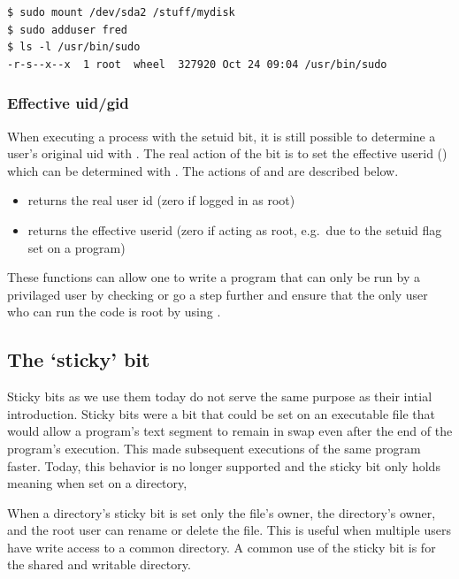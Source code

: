 \begin{lstlisting}
$ sudo mount /dev/sda2 /stuff/mydisk
$ sudo adduser fred
$ ls -l /usr/bin/sudo
-r-s--x--x  1 root  wheel  327920 Oct 24 09:04 /usr/bin/sudo
\end{lstlisting}

\subsubsection{Effective uid/gid}

When executing a process with the setuid bit, it is still possible to determine a user's original uid with . The real action of the  bit is to set the effective userid () which can be determined with . The actions of  and  are described below.

\begin{itemize}
\tightlist
\item
   returns the real user id (zero if logged in as root)
\item
   returns the effective userid (zero if acting as root, e.g.~due to the setuid flag set on a program)
\end{itemize}

These functions can allow one to write a program that can only be run by a privilaged user by checking  or go a step further and ensure that the only user who can run the code is root by using .

\subsection{The `sticky' bit}

Sticky bits as we use them today do not serve the same purpose as their intial introduction. Sticky bits were a bit that could be set on an executable file that would allow a program's text segment to remain in swap even after the end of the program's execution. This made subsequent executions of the same program faster. Today, this behavior is no longer supported and the sticky bit only holds meaning when set on a directory,

When a directory's sticky bit is set only the file's owner, the directory's owner, and the root user can rename or delete the file. This is useful when multiple users have write access to a common directory. A common use of the sticky bit is for the shared and writable  directory.

